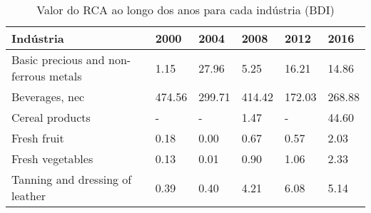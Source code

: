 \begin{table}
\centering
\caption{Valor do RCA ao longo dos anos para cada indústria (BDI)}
\begin{tabular}{p{6cm}p{1.5cm}p{1.5cm}p{1.5cm}p{1.5cm}p{1.5cm}}
\toprule
                            Indústria &   2000 &   2004 &   2008 &   2012 &   2016 \\
\midrule
Basic precious and non-ferrous metals &   1.15 &  27.96 &   5.25 &  16.21 &  14.86 \\
                       Beverages, nec & 474.56 & 299.71 & 414.42 & 172.03 & 268.88 \\
                      Cereal products &      - &      - &   1.47 &      - &  44.60 \\
                          Fresh fruit &   0.18 &   0.00 &   0.67 &   0.57 &   2.03 \\
                     Fresh vegetables &   0.13 &   0.01 &   0.90 &   1.06 &   2.33 \\
      Tanning and dressing of leather &   0.39 &   0.40 &   4.21 &   6.08 &   5.14 \\
\bottomrule
\end{tabular}
\end{table}
